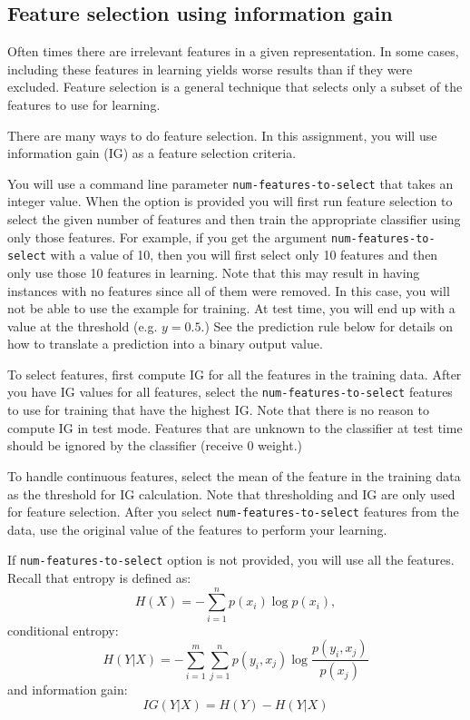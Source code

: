 \documentclass[11pt]{article}
\begin{document}

\subsection{Feature selection using information gain}
Often times there are irrelevant features in a given representation. In some cases, including these features in learning yields worse results than if they were excluded. Feature selection is a general technique that selects only a subset of the features to use for learning.

There are many ways to do feature selection. In this assignment, you will use information gain (IG) as a feature selection criteria.

You will use a command line parameter {\tt num-features-to-select} that takes an integer value. When the option is provided you will first run feature selection to select the given number of features and then train the appropriate classifier using only those features. For example, if you get the argument {\tt num-features-to-select} with a value of 10, then you will first select only 10 features and then only use those 10 features in learning. Note that this may result in having instances with no features since all of them were removed. In this case, you will not be able to use the example for training. At test time, you will end up with a value at the threshold (e.g. $y=0.5$.) See the prediction rule below for details on how to translate a prediction into a binary output value.

To select features, first compute IG for all the features in the training data. After you have IG values for all features, select the {\tt num-features-to-select} features to use for training that have the highest IG. Note that there is no reason to compute IG in test mode. Features that are unknown to the classifier at test time should be ignored by the classifier (receive 0 weight.)

To handle continuous features, select the mean of the feature in the training data as the threshold for IG calculation. Note that thresholding and IG are only used for feature selection. After you select {\tt num-features-to-select} features from the data, use the original value of the features to perform your learning. 

If {\tt num-features-to-select} option is not provided, you will use all the features.
\\

Recall that entropy is defined as:
\[
H(X) = -\sum_{i=1}^n p(x_i) \log p(x_i),
\]
conditional entropy:
\[
H(Y|X) =  - \sum_{i = 1}^m \sum_{j=1}^n p(y_i,x_j) \log \frac{p(y_i,x_j)}{p(x_j)}
\]
and information gain:
\[
IG(Y|X) = H(Y) - H(Y|X)
\]
\end{document}
